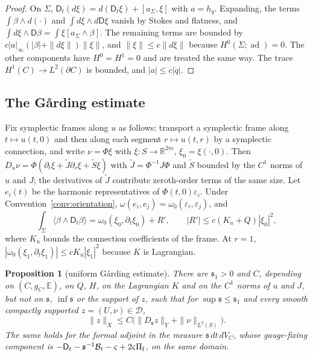 \documentclass[11pt]{amsart}
\newtheorem{proposition}[theorem]{Proposition}
\theoremstyle{definition}
\theoremstyle{remark}
\theoremstyle{plain}
\numberwithin{equation}{section}
\newcommand{\RR}{\mathbb{R}}
\newcommand{\ad}{\operatorname{ad}}
\begin{document}
\begin{proof}
On $\Sigma$, $\mathsf D_t(d\xi)=d(\mathsf D_t\xi)+[a_\Sigma,\xi]$ with
$a=h_{\dot q}$. Expanding, the terms $\int\beta\wedge d(\cdot)$ and
$\int d\xi\wedge d\mathsf D\xi$ vanish by Stokes and flatness, and
$\int d\xi\wedge\mathsf D\beta=\int\xi[a_\Sigma\wedge\beta]$. The
remaining terms are bounded by
$c|a|_\infty(|\beta|+\|d\xi\|)\|\xi\|$, and $\|\xi\|\le c\|d\xi\|$
because $H^0(\Sigma;\ad)=0$. The other components have
$H^0=H^1=0$ and are treated the same way. The trace $H^1(C)\to
L^2(\partial C)$ is bounded, and $|a|\le c|\dot q|$.
\end{proof}

\subsection{The Gårding estimate}\label{subsec:garding}

Fix symplectic frames along $u$ as follows: transport a symplectic frame
along $t\mapsto u(t,0)$ and then along each segment $r\mapsto u(t,r)$ by a
symplectic connection, and write $\nu=\Phi\xi$ with
$\xi\colon S\to\RR^{2m}$, $\xi_0=\xi(\cdot,0)$. Then $D_u\nu=\Phi(\partial_t\xi
+\tilde J\partial_r\xi+\tilde S\xi)$ with $\tilde J=\Phi^{-1}J\Phi$ and $\tilde S$ bounded by the $C^1$ norms of $u$
and $J$; the derivatives of $\tilde J$ contribute zeroth-order terms of the
same size. Let $e_i(t)$ be the harmonic representatives
of $\Phi(t,0)\varepsilon_i$. Under Convention~\ref{conv:orientation},
$\omega(e_i,e_j)=\omega_0(\varepsilon_i,\varepsilon_j)$, and
\begin{equation}\label{eq:seam-frame}
\int_\Sigma\langle\beta\wedge\mathsf D_t\beta\rangle=
\omega_0(\xi_0,\partial_t\xi_0)+R',\qquad |R'|\le c(K_u+Q)|\xi_0|^2,
\end{equation}
where $K_u$ bounds the connection coefficients of the frame. At $r=1$,
$|\omega_0(\xi_1,\partial_t\xi_1)|\le cK_u|\xi_1|^2$ because $K$ is
Lagrangian.

\begin{proposition}[uniform Gårding estimate]\label{prop:garding}
There are ${\mathfrak s}_1>0$ and $C$, depending on $(C,g_C,\mathbb E)$, on $Q$, $H$, on
the Lagrangian $K$ and on the $C^1$ norms of $u$ and $J$, but not on ${\mathfrak s}$, $\inf{\mathfrak s}$ or the
support of $z$, such that for $\sup{\mathfrak s}\le{\mathfrak s}_1$ and every smooth
compactly supported $z=(U,\nu)\in\mathcal D$,
\[
\|z\|_X\le C\bigl(\|D_{\mathfrak s} z\|_Y+\|\nu\|_{L^2(S)}\bigr).
\]
The same holds for the formal adjoint in the measure ${\mathfrak s}\,dt\,dV_C$,
whose gauge-fixing component is $-\mathsf D_t-{\mathfrak s}^{-1}\mathcal B_t-\varsigma+2\varsigma\Pi_{\rm f}$, on the
same domain.
\end{proposition}
\end{document}
